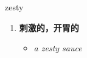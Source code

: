 
\begin{frame}
{\huge zesty}
\begin{center}
\begin{enumerate}\Large
  \item \textbf{刺激的，开胃的}
  \begin{itemize}
    \item \em{\Large{a zesty sauce}}
  \end{itemize}
\end{enumerate}
\end{center}
\end{frame}
